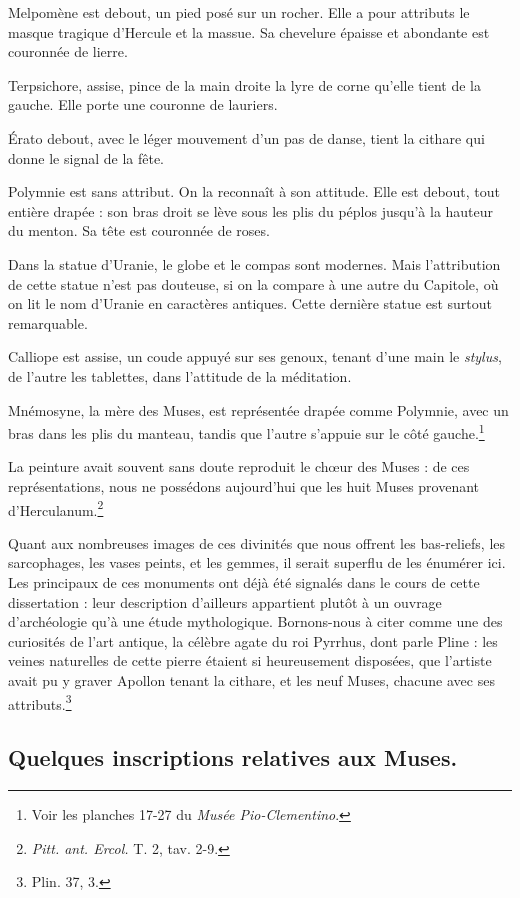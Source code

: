 \documentclass[a4paper, 11pt, oneside, polutonikogreek, french]{article}
\begin{document}
Melpomène est debout, un pied posé sur un rocher. Elle a pour attributs le masque tragique d'Hercule et la massue. Sa chevelure épaisse et abondante est couronnée de lierre.

Terpsichore, assise, pince de la main droite la lyre de corne qu'elle tient de la gauche. Elle porte une couronne de lauriers.

Érato debout, avec le léger mouvement d'un pas de danse, tient la cithare qui donne le signal de la fête.

Polymnie est sans attribut. On la reconnaît à son attitude. Elle est debout, tout entière drapée : son bras droit se lève sous les plis du péplos jusqu'à la hauteur du menton. Sa tête est couronnée de roses.

Dans la statue d'Uranie, le globe et le compas sont modernes. Mais l'attribution de cette statue n'est pas douteuse, si on la compare à une autre du Capitole, où on lit le nom d'Uranie en caractères antiques. Cette dernière statue est surtout remarquable.

Calliope est assise, un coude appuyé sur ses genoux, tenant d'une main le \emph{stylus}, de l'autre les tablettes, dans l'attitude de la méditation.

Mnémosyne, la mère des Muses, est représentée drapée comme Polymnie, avec un bras dans les plis du manteau, tandis que l'autre s'appuie sur le côté gauche.\footnote{Voir les planches 17-27 du \emph{Musée Pio-Clementino}.}

La peinture avait souvent sans doute reproduit le chœur des Muses : de ces représentations, nous ne possédons aujourd'hui que les huit Muses provenant d'Herculanum.\footnote{\emph{Pitt. ant. Ercol.} T. 2, tav. 2-9.}

Quant aux nombreuses images de ces divinités que nous offrent les bas-reliefs, les sarcophages, les vases peints, et les gemmes, il serait superflu de les énumérer ici. Les principaux de ces monuments ont déjà été signalés dans le cours de cette dissertation : leur description d'ailleurs appartient plutôt à un ouvrage d'archéologie qu'à une étude mythologique. Bornons-nous à citer comme une des curiosités de l'art antique, la célèbre agate du roi Pyrrhus, dont parle Pline : les veines naturelles de cette pierre étaient si heureusement disposées, que l'artiste avait pu y graver Apollon tenant la cithare, et les neuf Muses, chacune avec ses attributs.\footnote{Plin. 37, 3.}
\clearpage
\subsection{Quelques inscriptions relatives aux Muses.}
\end{document}
